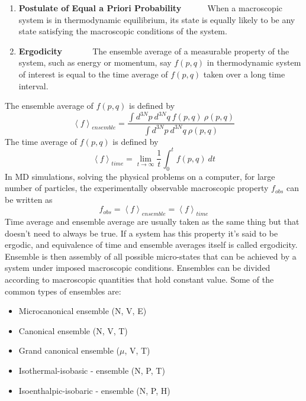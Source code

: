 \begin{enumerate}
\item \textbf{Postulate of Equal a Priori Probability} ~~~~~  When a macroscopic system is in
thermodynamic equilibrium,  its state is  equally likely to be any state satisfying the macroscopic conditions of the system.
\item \textbf{Ergodicity } ~~~~~~ The ensemble average  of a measurable property of the system, such as energy or momentum, say $f(p,q)$ in thermodynamic system of interest is equal to the time average  of $f(p,q)$ taken over a long time interval.
\end{enumerate}
The ensemble average of $f(p, q)$ is defined by
\begin{equation}
\left\langle f \right\rangle_{ensemble} = \frac{\int d^{3N}p~ d^{3N}q~ f(p, q)~ \rho (p,q)} {\int d^{3N}p~ d^{3N}q~ \rho (p,q)}
\end{equation}
The time average of  $f(p, q)$ is defined by 
\begin{equation}
\left\langle f \right\rangle_{time} = \lim_{t\to\infty} \frac{1}{t} \int_{0}^{t} f(p, q) ~ dt
\end{equation}
In MD simulations, solving the physical problems on a computer, for large number of particles, the experimentally observable macroscopic property $f_{obs}$ can be written as \citep{huang2009, Allen1989}
\begin{equation}
 f _{obs} = \left\langle f \right\rangle_{ensemble} = \left\langle f \right\rangle_{time}
\end{equation}
Time average and ensemble average are usually taken as the same thing but that  doesn't need to always be true. If a system has this property it's said to be ergodic, and equivalence of time and ensemble averages itself is called ergodicity. Ensemble is then assembly of all possible micro-states that can be achieved by a system under imposed macroscopic conditions. Ensembles can be divided according to macroscopic quantities that hold constant value. Some of the common  types of ensembles are:
\begin{itemize}
\item Microcanonical ensemble (N, V, E)
\item Canonical ensemble (N, V, T)
\item Grand canonical ensemble ($\mu$, V, T)
\item  Isothermal-isobasic - ensemble (N, P, T)
\item Isoenthalpic-isobaric -  ensemble (N, P, H)
\end{itemize}

